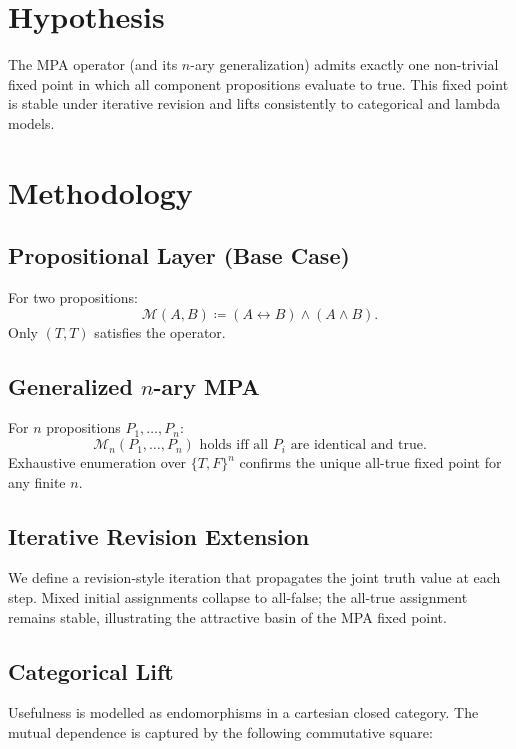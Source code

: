 \documentclass[11pt,a4paper]{article}
\begin{document}
\section{Hypothesis}
The MPA operator (and its \(n\)-ary generalization) admits exactly one non-trivial fixed point in which all component propositions evaluate to true. This fixed point is stable under iterative revision and lifts consistently to categorical and lambda models.

\section{Methodology}

\subsection{Propositional Layer (Base Case)}
For two propositions:
\[
\mathcal{M}(A,B) \coloneqq (A \leftrightarrow B) \land (A \land B).
\]
Only \((T,T)\) satisfies the operator.

\subsection{Generalized \(n\)-ary MPA}
For \(n\) propositions \(P_1,\dots,P_n\):
\[
\mathcal{M}_n(P_1,\dots,P_n) \text{ holds iff all } P_i \text{ are identical and true}.
\]
Exhaustive enumeration over \(\{T,F\}^n\) confirms the unique all-true fixed point for any finite \(n\).

\subsection{Iterative Revision Extension}
We define a revision-style iteration that propagates the joint truth value at each step. Mixed initial assignments collapse to all-false; the all-true assignment remains stable, illustrating the attractive basin of the MPA fixed point.

\subsection{Categorical Lift}
Usefulness is modelled as endomorphisms in a cartesian closed category. The mutual dependence is captured by the following commutative square:

\begin{center}
\end{center}
\end{document}
